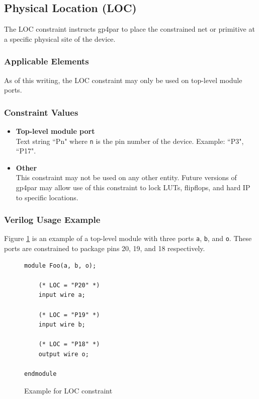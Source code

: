 \documentclass[11pt]{article}
\begin{document}

\pagebreak
\subsection{Physical Location (LOC)}

The LOC constraint instructs gp4par to place the constrained net or primitive at a specific physical site of the 
device.

\subsubsection{Applicable Elements}
As of this writing, the LOC constraint may only be used on top-level module ports.

\subsubsection{Constraint Values}
\begin{itemize}
\item {\bfseries Top-level module port}\\
Text string ``Pn" where \texttt{n} is the pin number of the device. Example: ``P3", ``P17".
\item {\bfseries Other} \\
This constraint may not be used on any other entity. Future versions of gp4par may allow use of this constraint 
to lock LUTs, flipflops, and hard IP to specific locations.
\end{itemize}

\subsubsection{Verilog Usage Example}

Figure \ref{constraint-loc} is an example of a top-level module with three ports \texttt{a}, \texttt{b}, and \texttt{o}.
These ports are constrained to package pins 20, 19, and 18 respectively.

\begin{figure}[h]
\begin{lstlisting}
module Foo(a, b, o);

	(* LOC = "P20" *)
	input wire a;

	(* LOC = "P19" *)
	input wire b;

	(* LOC = "P18" *)
	output wire o;
	
endmodule
\end{lstlisting}
\caption{Example for LOC constraint}
\label{constraint-loc}
\end{figure}
\end{document}
